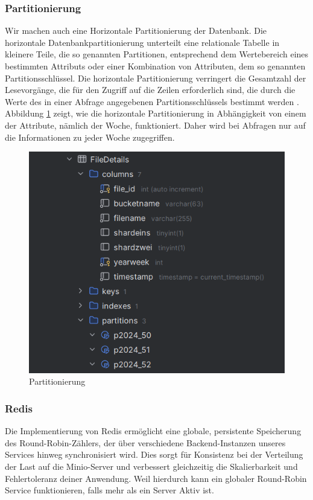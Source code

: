 \documentclass[12pt]{report}
\begin{document}
			\subsubsection{Partitionierung}
				Wir machen auch eine Horizontale Partitionierung der Datenbank. Die horizontale Datenbankpartitionierung unterteilt eine relationale Tabelle in kleinere Teile, die so genannten Partitionen, entsprechend dem Wertebereich eines bestimmten Attributs oder einer Kombination von Attributen, dem so genannten Partitionsschlüssel. Die horizontale Partitionierung verringert die Gesamtzahl der Lesevorgänge, die für den Zugriff auf die Zeilen erforderlich sind, die durch die Werte des in einer Abfrage angegebenen Partitionsschlüssels bestimmt werden \cite{alsultanny2010database}. Abbildung \ref{fig:partitionierung} zeigt, wie die horizontale Partitionierung in Abhängigkeit von einem der Attribute, nämlich der Woche, funktioniert. Daher wird bei Abfragen nur auf die Informationen zu jeder Woche zugegriffen.
				
				\begin{figure}[h]
					\centering
					\includegraphics[width=0.8\linewidth]{partitionierung}
					\caption{Partitionierung}
					\label{fig:partitionierung}
				\end{figure}
				
				\subsubsection{Redis}
				Die Implementierung von Redis ermöglicht eine globale, persistente Speicherung des Round-Robin-Zählers, der über verschiedene Backend-Instanzen unseres Services hinweg synchronisiert wird. Dies sorgt für Konsistenz bei der Verteilung der Last auf die Minio-Server und verbessert gleichzeitig die Skalierbarkeit und Fehlertoleranz deiner Anwendung. Weil hierdurch kann ein globaler Round-Robin Service funktionieren, falls mehr als ein Server Aktiv ist.
\end{document}
